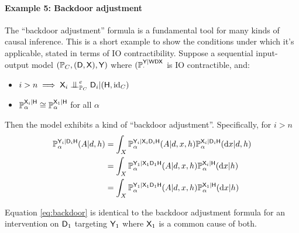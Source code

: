 \paragraph{Example 5: Backdoor adjustment}

The ``backdoor adjustment'' formula is a fundamental tool for many kinds of causal inference. This is a short example to show the conditions under which it's applicable, stated in terms of IO contractibility. Suppose a sequential input-output model $(\mathbb{P}_C,(\mathsf{D},\mathsf{X}),\mathsf{Y})$ where $(\mathbb{P}_\cdot^{\mathsf{Y}|\mathsf{WDX}}$ is IO contractible, and:
\begin{itemize}
    \item $i>n\implies \RV{X}_{i}\CI^e_{\prob{P}_C}\RV{D}_{i}|(\RV{H},\text{id}_C)$
    \item $\mathbb{P}_\alpha^{\mathsf{X}_{i}|\mathsf{H}}\cong \mathbb{P}_\alpha^{\mathsf{X}_{1}|\mathsf{H}}$ for all $\alpha$
 \end{itemize}
Then the model exhibits a kind of ``backdoor adjustment''. Specifically, for $i>n$
\begin{align}
    \mathbb{P}_\alpha^{\mathsf{Y}_{i}|\mathsf{D}_{i}\mathsf{H}}(A|d,h) &= \int_X \mathbb{P}_\alpha^{\mathsf{Y}_{i}|\mathsf{X}_{i}\mathsf{D}_{i}\mathsf{H}}(A|d,x,h)\mathbb{P}_\alpha^{\mathsf{X}_{i}|\mathsf{D}_{i}\mathsf{H}}(\mathrm{d}x|d,h)\\
    &= \int_X \mathbb{P}_\alpha^{\mathsf{Y}_{1}|\mathsf{X}_{1}\mathsf{D}_{1}\mathsf{H}}(A|d,x,h)\mathbb{P}_\alpha^{\mathsf{X}_{i}|\mathsf{H}}(\mathrm{d}x|h)\\
    &= \int_X \mathbb{P}_\alpha^{\mathsf{Y}_{1}|\mathsf{X}_{1}\mathsf{D}_{1}\mathsf{H}}(A|d,x,h)\mathbb{P}_\alpha^{\mathsf{X}_{1}|\mathsf{H}}(\mathrm{d}x|h)\label{eq:backdoor}
\end{align}

Equation \eqref{eq:backdoor} is identical to the backdoor adjustment formula \citep[Chap. 1]{pearl_causality:_2009} for an intervention on $\mathsf{D}_1$ targeting $\mathsf{Y}_1$ where $\mathsf{X}_1$ is a common cause of both.





